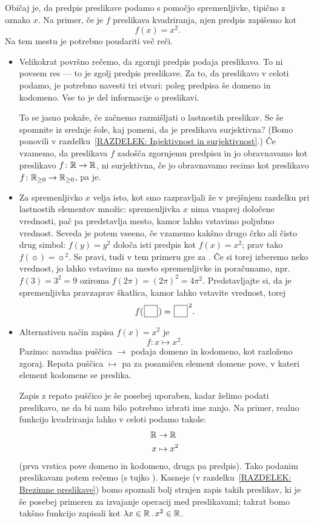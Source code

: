 		Običaj je, da predpis preslikave podamo s pomočjo spremenljivke, tipično z oznako $x$. Na primer, če je $f$ preslikava kvadriranja, njen predpis zapišemo kot
		\[f(x) = x^2.\]
		Na tem mestu je potrebno poudariti več reči.
		\begin{itemize}
			\item
				Velikokrat površno rečemo, da zgornji predpis podaja preslikavo. To ni povsem res --- to je zgolj predpis preslikave. Za to, da preslikavo v celoti podamo, je potrebno navesti tri stvari: poleg predpisa še domeno in kodomeno. Vse to je del informacije o preslikavi.
				
				To se jasno pokaže, če začnemo razmišljati o lastnostih preslikav. Se še spomnite iz srednje šole, kaj pomeni, da je preslikava surjektivna? (Bomo ponovili v razdelku~\ref{RAZDELEK: Injektivnost in surjektivnost}.) Če vzamemo, da preslikava $f$ zadošča zgornjemu predpisu in jo obravnavamo kot preslikavo $f\colon \mathbb{R} \to \mathbb{R}$, ni surjektivna, če jo obravnavamo recimo kot preslikavo $f\colon \mathbb{R}_{\geq 0} \to \mathbb{R}_{\geq 0}$, pa je.
			\item
				Za spremenljivko $x$ velja isto, kot smo razpravljali že v prejšnjem razdelku pri lastnostih elementov množic: spremenljivka $x$ nima vnaprej določene vrednosti, pač pa predstavlja mesto, kamor lahko vstavimo poljubno vrednost. Seveda je potem vseeno, če vzamemo kakšno drugo črko ali čisto drug simbol: $f(y) = y^2$ določa isti predpis kot $f(x) = x^2$; prav tako $f(\sun) = \sun^2$. Se pravi, tudi v tem primeru gre za . Če si torej izberemo neko vrednost, jo lahko vstavimo na mesto spremenljivke in poračunamo, npr.~$f(3) = 3^2 = 9$ oziroma $f(2\pi) = (2\pi)^2 = 4\pi^2$. Predstavljajte si, da je spremenljivka pravzaprav škatlica, kamor lahko vstavite vrednost, torej
				\[f(\argbox) = \argbox^2.\]
			\item
				Alternativen način zapisa $f(x) = x^2$ je
				\[f\colon x \mapsto x^2.\]
				Pazimo: navadna puščica $\to$ podaja domeno in kodomeno, kot razloženo zgoraj. Repata puščica $\mapsto$ pa za posamičen element domene pove, v kateri element kodomene se preslika.
				
				Zapis z repato puščico je še posebej uporaben, kadar želimo podati preslikavo, ne da bi nam bilo potrebno izbrati ime zanjo. Na primer, realno funkcijo kvadriranja lahko v celoti podamo takole:
				\begin{align*}
					\mathbb{R} &\to \mathbb{R} \\
					x &\mapsto x^2
				\end{align*}
				(prva vrstica pove domeno in kodomeno, druga pa predpis). Tako podanim preslikavam potem rečemo  (s tujko ). Kasneje (v razdelku~\ref{RAZDELEK: Brezimne preslikave}) bomo spoznali bolj strnjen zapis takih preslikav, ki je še posebej primeren za izvajanje operacij med preslikavami; takrat bomo takšno funkcijo zapisali kot $\xlam{x}[\RR]{x^2}[\RR]$.
		\end{itemize}
		
